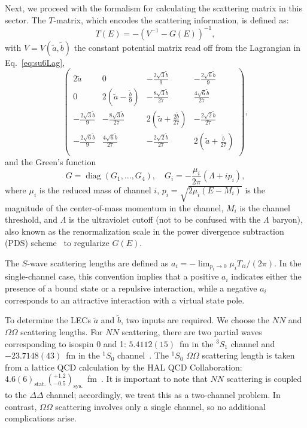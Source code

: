 \documentclass[prl,showpacs,twocolumn,superscriptaddress,floatfix,10pt,footinbib]{revtex4-2}
\begin{document}
Next, we proceed with the formalism for calculating the scattering matrix in this sector. The $T$-matrix, which encodes the scattering information, is defined as:
\begin{equation}
T\left(E\right)=-\left(V^{-1}-G\left(E\right)\right)^{-1},
\end{equation}
with $V=V(\tilde{a},\tilde{b})$ the constant potential matrix read off from the Lagrangian in Eq.~\eqref{eq:su6Lag},
\begin{equation}
\left( \begin{matrix}
	2\tilde{a}&		0&		-\frac{2\sqrt{3}\tilde{b}}{9}&		-\frac{2\sqrt{6}\tilde{b}}{9}\\
	0&		2\left( \tilde{a}-\frac{\tilde{b}}{9} \right)&		-\frac{8\sqrt{3}\tilde{b}}{27}&		\frac{4\sqrt{6}\tilde{b}}{27}\\
	-\frac{2\sqrt{3}\tilde{b}}{9}&		-\frac{8\sqrt{3}\tilde{b}}{27}&		2\left( \tilde{a}+\frac{2\tilde{b}}{27} \right)&		-\frac{2\sqrt{2}\tilde{b}}{27}\\
	-\frac{2\sqrt{6}\tilde{b}}{9}&		\frac{4\sqrt{6}\tilde{b}}{27}&		-\frac{2\sqrt{2}\tilde{b}}{27}&		2\left( \tilde{a}+\frac{\tilde{b}}{27} \right)\\
\end{matrix} \right),
\label{eq:V}
\end{equation}
and the Green's function
\begin{equation}
G=\operatorname{diag}\left(G_1,\ldots,G_{4}\right),\quad G_i=-\frac{\mu_i}{2\pi}\left( \Lambda +ip_i \right),
\end{equation}
where $\mu_i$ is the reduced mass of channel $i$, $p_i=\sqrt{2\mu_i(E-M_i)}$ is the magnitude of the center-of-mass momentum in the channel, $M_i$ is the channel threshold, and $\Lambda$ is the ultraviolet cutoff (not to be confused with the $\Lambda$ baryon), also known as the renormalization scale in the power divergence subtraction (PDS) scheme~\cite{Kaplan:1998tg, Kaplan:1998we} to regularize $G(E)$.

The $S$-wave scattering lengths are defined as $a_i=-\lim_{p_i\rightarrow 0} {\mu _i}T_{ii}/({2\pi})$. In the single-channel case, this convention implies that a positive $a_i$ indicates either the presence of a bound state or a repulsive interaction, while a negative $a_i$ corresponds to an attractive interaction with a virtual state pole.

To determine the LECs $\tilde{a}$ and $\tilde{b}$, two inputs are required. We choose the $NN$ and $\Omega\Omega$ scattering lengths. For $NN$ scattering, there are two partial waves corresponding to isospin 0 and 1: $5.4112(15)$~fm in the $^3S_1$ channel and $-23.7148(43)$~fm in the $^1S_0$ channel~\cite{Hackenburg:2006qd}. The $^1S_0$ $\Omega\Omega$ scattering length is taken from a lattice QCD calculation by the HAL QCD Collaboration: $4.6(6)_\text{stat.}(^{+1.2}_{-0.5})_\text{sys.}$~fm~\cite{Gongyo:2017fjb}. It is important to note that $NN$ scattering is coupled to the $\Delta\Delta$ channel; accordingly, we treat this as a two-channel problem. In contrast, $\Omega\Omega$ scattering involves only a single channel, so no additional complications arise.
\end{document}
